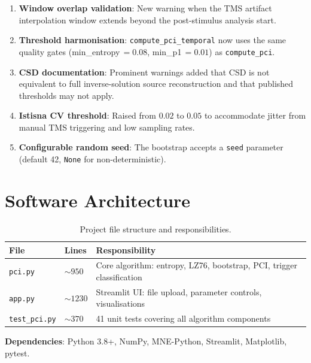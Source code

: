 \documentclass[11pt,a4paper]{article}
\begin{document}
\begin{enumerate}[leftmargin=2em]
  \item \textbf{Window overlap validation}: New warning when the TMS artifact interpolation
        window extends beyond the post-stimulus analysis start.

  \item \textbf{Threshold harmonisation}: \texttt{compute\_pci\_temporal} now uses the same
        quality gates (min\_entropy$\,= 0.08$, min\_p1$\,= 0.01$) as \texttt{compute\_pci}.

  \item \textbf{CSD documentation}: Prominent warnings added that CSD is not equivalent to
        full inverse-solution source reconstruction and that published thresholds may not apply.

  \item \textbf{Istisna CV threshold}: Raised from $0.02$ to $0.05$ to accommodate jitter
        from manual TMS triggering and low sampling rates.

  \item \textbf{Configurable random seed}: The bootstrap accepts a \texttt{seed} parameter
        (default 42, \texttt{None} for non-deterministic).
\end{enumerate}

\section{Software Architecture}
\label{sec:arch}

\begin{table}[H]
\centering
\caption{Project file structure and responsibilities.}
\label{tab:files}
\begin{tabular}{@{}lll@{}}
\toprule
\textbf{File} & \textbf{Lines} & \textbf{Responsibility} \\
\midrule
\texttt{pci.py}       & ${\sim}950$  & Core algorithm: entropy, LZ76, bootstrap, PCI, trigger classification \\
\texttt{app.py}       & ${\sim}1230$ & Streamlit UI: file upload, parameter controls, visualisations \\
\texttt{test\_pci.py} & ${\sim}370$  & 41 unit tests covering all algorithm components \\
\bottomrule
\end{tabular}
\end{table}

\noindent
\textbf{Dependencies}: Python 3.8+, NumPy, MNE-Python, Streamlit, Matplotlib, pytest.
\end{document}
